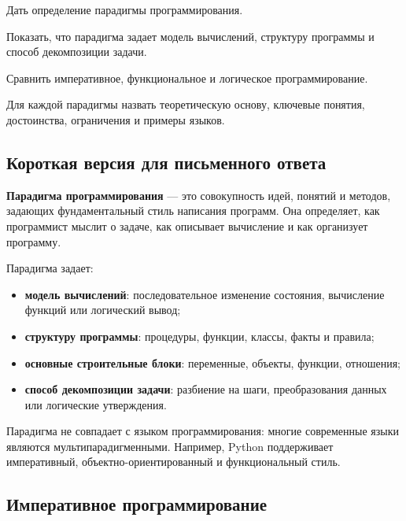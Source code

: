 
\begin{examplan}
    \item Дать определение парадигмы программирования.
    \item Показать, что парадигма задает модель вычислений, структуру программы и способ декомпозиции задачи.
    \item Сравнить императивное, функциональное и логическое программирование.
    \item Для каждой парадигмы назвать теоретическую основу, ключевые понятия, достоинства, ограничения и примеры языков.
\end{examplan}

\subsection*{Короткая версия для письменного ответа}

\textbf{Парадигма программирования} --- это совокупность идей, понятий и методов, задающих фундаментальный стиль написания программ. Она определяет, как программист мыслит о задаче, как описывает вычисление и как организует программу.

Парадигма задает:
\begin{itemize}
    \item \textbf{модель вычислений}: последовательное изменение состояния, вычисление функций или логический вывод;
    \item \textbf{структуру программы}: процедуры, функции, классы, факты и правила;
    \item \textbf{основные строительные блоки}: переменные, объекты, функции, отношения;
    \item \textbf{способ декомпозиции задачи}: разбиение на шаги, преобразования данных или логические утверждения.
\end{itemize}

Парадигма не совпадает с языком программирования: многие современные языки являются мультипарадигменными. Например, Python поддерживает императивный, объектно-ориентированный и функциональный стиль.

\subsection*{Императивное программирование}

